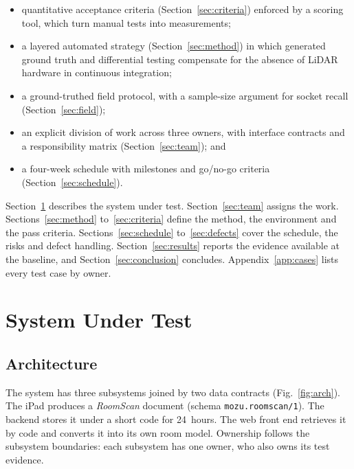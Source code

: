\documentclass[conference,a4paper,10pt]{IEEEtran}
\begin{document}
\begin{itemize}
\item quantitative acceptance criteria (Section~\ref{sec:criteria}) enforced
  by a scoring tool, which turn manual tests into measurements;
\item a layered automated strategy (Section~\ref{sec:method}) in which
  generated ground truth and differential testing compensate for the absence
  of LiDAR hardware in continuous integration;
\item a ground-truthed field protocol, with a sample-size argument for socket
  recall (Section~\ref{sec:field});
\item an explicit division of work across three owners, with interface
  contracts and a responsibility matrix (Section~\ref{sec:team}); and
\item a four-week schedule with milestones and go/no-go criteria
  (Section~\ref{sec:schedule}).
\end{itemize}

Section~\ref{sec:sut} describes the system under test.
Section~\ref{sec:team} assigns the work. Sections~\ref{sec:method}
to~\ref{sec:criteria} define the method, the environment and the pass
criteria. Sections~\ref{sec:schedule} to~\ref{sec:defects} cover the
schedule, the risks and defect handling. Section~\ref{sec:results} reports
the evidence available at the baseline, and Section~\ref{sec:conclusion}
concludes. Appendix~\ref{app:cases} lists every test case by owner.

\section{System Under Test}\label{sec:sut}

\subsection{Architecture}

The system has three subsystems joined by two data contracts
(Fig.~\ref{fig:arch}). The iPad produces a \emph{RoomScan} document (schema
\texttt{mozu.roomscan/1}). The backend stores it under a short code for
24~hours. The web front end retrieves it by code and converts it into its own
room model. Ownership follows the subsystem boundaries: each subsystem has one
owner, who also owns its test evidence.
\end{document}
